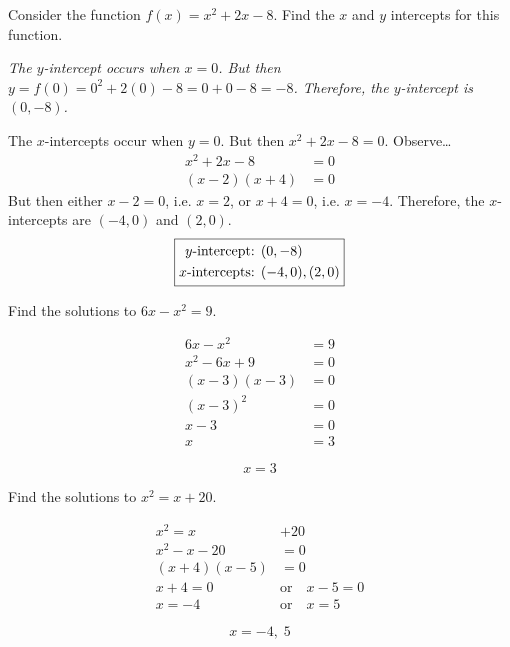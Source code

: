 \documentclass[12pt,letterpaper]{exam}
\begin{document}
\begin{questions}
\newpage
\question[5] Consider the function $f(x)= x^2 + 2x - 8$. Find the $x$ and $y$ intercepts for this function. \pspace

{\noindent\itshape The $y$-intercept occurs when $x= 0$. But then $y= f(0)= 0^2 + 2(0) - 8= 0 + 0 - 8= -8$. Therefore, the $y$-intercept is $(0, -8)$. \pspace

The $x$-intercepts occur when $y= 0$. But then $x^2 + 2x - 8= 0$. Observe\dots
	\[
	\begin{aligned}
	x^2 + 2x - 8&= 0 \\
	(x - 2)(x + 4)&= 0
	\end{aligned}
	\]
But then either $x - 2= 0$, i.e. $x= 2$, or $x + 4= 0$, i.e. $x= -4$. Therefore, the $x$-intercepts are $(-4, 0)$ and $(2, 0)$. \pvspace{1cm}
	\[
	\boxed{%
	\begin{aligned}
	y\text{-intercept: }& (0, -8) \\
	x\text{-intercepts: }& (-4, 0), (2, 0)
	\end{aligned}
	}
	\]
}





\newpage
\question[5] Find the solutions to $6x - x^2= 9$. \pspace

	\[
	\begin{aligned}
	6x - x^2&= 9 \\[0.3cm]
	x^2 - 6x + 9&= 0 \\[0.3cm] 
	(x - 3)(x - 3)&= 0 \\[0.3cm]
	(x - 3)^2&= 0 \\[0.3cm]
	x - 3&= 0 \\[0.3cm]
	x&= 3
	\end{aligned}
	\] \pspace
	
	\[
	\boxed{x= 3}
	\]





\newpage
\question[5] Find the solutions to $x^2= x + 20$. \pspace

	\[
	\begin{aligned}
	x^2= x &+ 20 \\[0.3cm]
	x^2 - x - 20&= 0 \\[0.3cm]
	(x + 4)(x - 5)&= 0 \\[0.3cm]
	x + 4= 0 \quad &\text{or} \quad x - 5= 0 \\[0.3cm]
	x= -4 \quad &\text{or} \quad x= 5
	\end{aligned}
	\] \pspace
	
	\[
	\boxed{x= -4,\; 5}
	\]






\end{questions}
\end{document}
